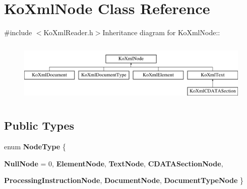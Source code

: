 \hypertarget{classKoXmlNode}{
\section{KoXmlNode Class Reference}
\label{classKoXmlNode}
}


{\ttfamily \#include $<$KoXmlReader.h$>$}Inheritance diagram for KoXmlNode::\begin{figure}[H]
\begin{center}
\leavevmode
\includegraphics[height=2.97872cm]{classKoXmlNode}
\end{center}
\end{figure}
\subsection*{Public Types}
\begin{DoxyCompactItemize}
\item 
enum {\bfseries NodeType} \{ \par
{\bfseries NullNode} =  0, 
{\bfseries ElementNode}, 
{\bfseries TextNode}, 
{\bfseries CDATASectionNode}, 
\par
{\bfseries ProcessingInstructionNode}, 
{\bfseries DocumentNode}, 
{\bfseries DocumentTypeNode}
 \}
\end{DoxyCompactItemize}
